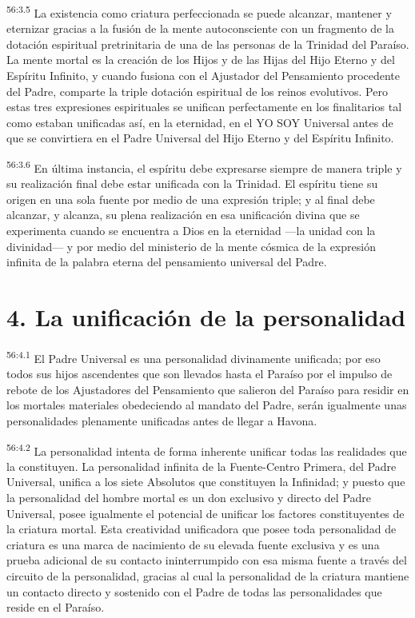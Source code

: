\par
\textsuperscript{56:3.5} La existencia como criatura perfeccionada se puede alcanzar, mantener y eternizar gracias a la fusión de la mente autoconsciente con un fragmento de la dotación espiritual pretrinitaria de una de las personas de la Trinidad del Paraíso. La mente mortal es la creación de los Hijos y de las Hijas del Hijo Eterno y del Espíritu Infinito, y cuando fusiona con el Ajustador del Pensamiento procedente del Padre, comparte la triple dotación espiritual de los reinos evolutivos. Pero estas tres expresiones espirituales se unifican perfectamente en los finalitarios tal como estaban unificadas así, en la eternidad, en el YO SOY Universal antes de que se convirtiera en el Padre Universal del Hijo Eterno y del Espíritu Infinito.

\par
\textsuperscript{56:3.6} En última instancia, el espíritu debe expresarse siempre de manera triple y su realización final debe estar unificada con la Trinidad. El espíritu tiene su origen en una sola fuente por medio de una expresión triple; y al final debe alcanzar, y alcanza, su plena realización en esa unificación divina que se experimenta cuando se encuentra a Dios en la eternidad ---la unidad con la divinidad--- y por medio del ministerio de la mente cósmica de la expresión infinita de la palabra eterna del pensamiento universal del Padre.

\section*{4. La unificación de la personalidad}
\par
\textsuperscript{56:4.1} El Padre Universal es una personalidad divinamente unificada; por eso todos sus hijos ascendentes que son llevados hasta el Paraíso por el impulso de rebote de los Ajustadores del Pensamiento que salieron del Paraíso para residir en los mortales materiales obedeciendo al mandato del Padre, serán igualmente unas personalidades plenamente unificadas antes de llegar a Havona.

\par
\textsuperscript{56:4.2} La personalidad intenta de forma inherente unificar todas las realidades que la constituyen. La personalidad infinita de la Fuente-Centro Primera, del Padre Universal, unifica a los siete Absolutos que constituyen la Infinidad; y puesto que la personalidad del hombre mortal es un don exclusivo y directo del Padre Universal, posee igualmente el potencial de unificar los factores constituyentes de la criatura mortal. Esta creatividad unificadora que posee toda personalidad de criatura es una marca de nacimiento de su elevada fuente exclusiva y es una prueba adicional de su contacto ininterrumpido con esa misma fuente a través del circuito de la personalidad, gracias al cual la personalidad de la criatura mantiene un contacto directo y sostenido con el Padre de todas las personalidades que reside en el Paraíso.

